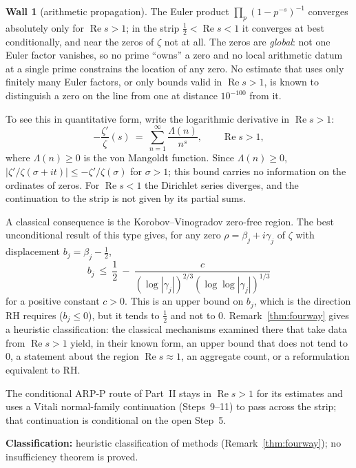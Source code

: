 \documentclass[11pt]{amsart}
\theoremstyle{definition}
\theoremstyle{remark}
\theoremstyle{definition}
\newtheorem{obstruction}{Wall}[section]
\renewcommand{\Re}{\operatorname{Re}}
\begin{document}
\begin{obstruction}[arithmetic propagation]\label{ob:propagation}
The Euler product $\prod_p(1-p^{-s})^{-1}$ converges absolutely only for $\Re s>1$; in the strip
$\tfrac12<\Re s<1$ it converges at best conditionally, and near the zeros of $\zeta$ not at all. The zeros
are \emph{global}: not one Euler factor vanishes, so no prime ``owns'' a zero and no local arithmetic datum
at a single prime constrains the location of any zero. No estimate that uses only finitely many Euler
factors, or only bounds valid in $\Re s>1$, is known to distinguish a zero on the line from one at
distance $10^{-100}$ from it.

To see this in quantitative form, write the logarithmic derivative in $\Re s>1$:
\[
   -\frac{\zeta'}{\zeta}(s)\ =\ \sum_{n=1}^\infty \frac{\Lambda(n)}{n^s},\qquad \Re s>1,
\]
where $\Lambda(n)\ge0$ is the von Mangoldt function. Since $\Lambda(n)\ge0$, $|\zeta'/\zeta(\sigma+it)|\le-\zeta'/\zeta(\sigma)$ for $\sigma>1$; this bound
carries no information on the ordinates of zeros. For $\Re s<1$ the Dirichlet series diverges, and the
continuation to the strip is not given by its partial sums.

A classical consequence is the Korobov--Vinogradov zero-free region. The best unconditional result of
this type gives, for any zero $\rho=\beta_j+i\gamma_j$ of $\zeta$ with displacement $b_j=\beta_j-\tfrac12$,
\[
   b_j\ \le\ \frac{1}{2}\ -\ \frac{c}{(\log|\gamma_j|)^{2/3}(\log\log|\gamma_j|)^{1/3}}
\]
for a positive constant $c>0$. This is an upper bound on $b_j$, which is the direction RH requires
($b_j\le0$), but it tends to $\tfrac12$ and not to $0$. Remark~\ref{thm:fourway} gives a heuristic
classification: the classical mechanisms examined there that take data from $\Re s>1$ yield, in their
known form, an upper bound that does not tend to $0$, a statement about the region $\Re s\approx1$, an
aggregate count, or a reformulation equivalent to RH.

The conditional ARP-P route of Part~II stays in $\Re s>1$ for its estimates and uses a Vitali
normal-family continuation (Steps~9--11) to pass across the strip; that continuation is conditional on
the open Step~5.

\smallskip\noindent\textbf{Classification:} heuristic classification of methods (Remark~\ref{thm:fourway});
no insufficiency theorem is proved.
\end{obstruction}
\end{document}
